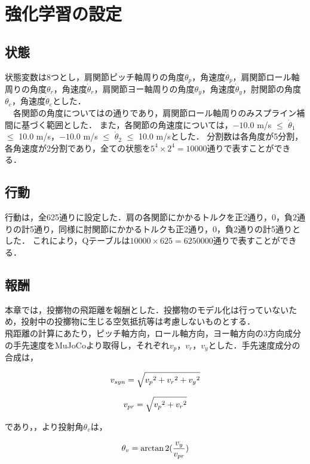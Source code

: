 \section{強化学習の設定}
\subsection{状態}
状態変数は8つとし，肩関節ピッチ軸周りの角度$\theta_{p}$，角速度$\dot{\theta}_{p}$，肩関節ロール軸周りの角度$\theta_{r}$，角速度$\dot{\theta}_{r}$，肩関節ヨー軸周りの角度$\theta_{y}$，角速度$\dot{\theta}_{y}$，肘関節の角度$\theta_{e}$，角速度$\dot{\theta}_{e}$とした．\\
　各関節の角度についてはの通りであり，肩関節ロール軸周りのみスプライン補間に基づく範囲とした．
また，各関節の角速度については，$-10.0$ m/s $\le$ $\dot{\theta}_{1}$ $\le$ 10.0 m/s，$-10.0$ m/s $\le$ $\dot{\theta}_{2}$ $\le$ 10.0 m/sとした．
分割数は各角度が5分割，各角速度が2分割であり，全ての状態を$5^{4}\times 2^{4}=10000$通りで表すことができる．
\subsection{行動}
行動は，全625通りに設定した．肩の各関節にかかるトルクを正2通り，0，負2通りの計5通り，同様に肘関節にかかるトルクも正2通り，0，負2通りの計5通りとした．
これにより，Qテーブルは$10000 \times 625=6250000$通りで表すことができる．
\subsection{報酬}
本章では，投擲物の飛距離を報酬とした．投擲物のモデル化は行っていないため，投射中の投擲物に生じる空気抵抗等は考慮しないものとする．\\
飛距離の計算にあたり，ピッチ軸方向，ロール軸方向，ヨー軸方向の3方向成分の手先速度をMuJoCoより取得し，それぞれ$v_{p}$，$v_{r}$，$v_{y}$とした．手先速度成分の合成は，

\begin{eqnarray}
  \equlabel{5.1}
  v_{syn} = \sqrt{{v_{p}}^{2} + {v_{r}}^{2} + {v_{y}}^{2}}
\end{eqnarray}

\begin{eqnarray}
  \equlabel{5.2}
  v_{pr} = \sqrt{{v_{p}}^{2} + {v_{r}}^{2}}
\end{eqnarray}

であり，，より投射角$\theta_{v}$は，

\begin{eqnarray}
  \equlabel{5.3}
  \theta_{v} = \arctan2(\frac{v_{y}}{v_{pr}})
\end{eqnarray}

